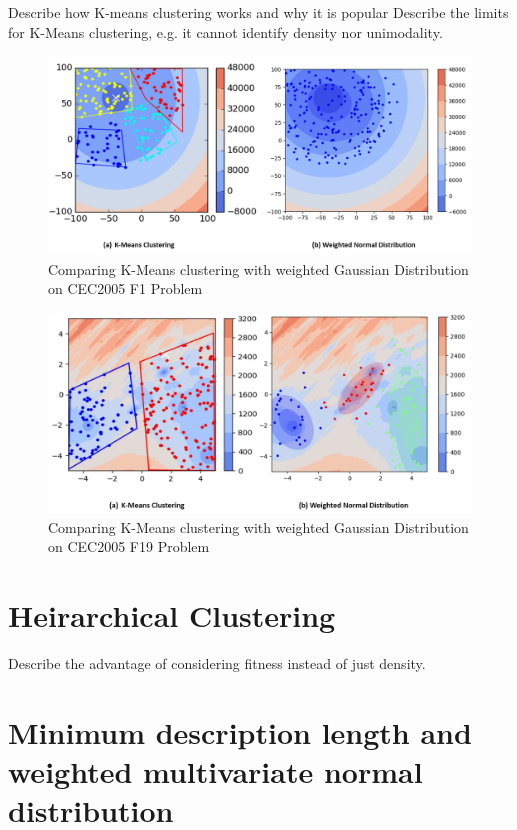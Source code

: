 Describe how K-means clustering works and why it is popular Describe the limits for K-Means clustering, 
e.g. it cannot identify density nor unimodality.  

\begin{figure} 
\centering
\includegraphics[width=\textwidth]{Clustering_comparison} 
\caption{Comparing K-Means clustering with weighted Gaussian Distribution on CEC2005 F1 Problem}\label{fig:Clustering_comparison}
\end{figure}

\begin{figure}
\centering
\includegraphics[width=\textwidth]{Clustering_comparison_F19}
\caption{Comparing K-Means clustering with weighted Gaussian Distribution on CEC2005 F19 Problem}\label{fig:Clustering_comparison_F19}
\end{figure}


\section{Heirarchical Clustering}
Describe the advantage of considering fitness instead of just density.



\section{Minimum description length and weighted multivariate normal distribution}

